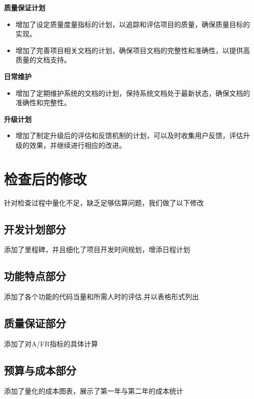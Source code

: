 \documentclass{article}
\begin{document}
\textbf{质量保证计划}
\begin{itemize}
	\item 增加了设定质量度量指标的计划，以追踪和评估项目的质量，确保质量目标的实现。
	\item 增加了完善项目相关文档的计划，确保项目文档的完整性和准确性，以提供高质量的文档支持。
\end{itemize}

\textbf{日常维护}
\begin{itemize}
	\item 增加了定期维护系统的文档的计划，保持系统文档处于最新状态，确保文档的准确性和完整性。
\end{itemize}

\textbf{升级计划}
\begin{itemize}
	\item 增加了制定升级后的评估和反馈机制的计划，可以及时收集用户反馈，评估升级的效果，并继续进行相应的改进。
\end{itemize}


\section{检查后的修改}
针对检查过程中量化不足，缺乏足够估算问题，我们做了以下修改
\subsection{开发计划部分}
添加了里程碑，并且细化了项目开发时间规划，增添日程计划
\subsection{功能特点部分}
添加了各个功能的代码当量和所需人时的评估,并以表格形式列出
\subsection{质量保证部分}
添加了对A/FR指标的具体计算
\subsection{预算与成本部分}
添加了量化的成本图表，展示了第一年与第二年的成本统计
\end{document}
